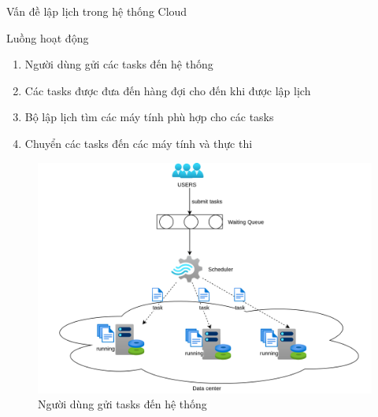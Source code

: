 \documentclass[11pt,xcolor={dvipsnames}, aspectratio=169]{beamer}
\begin{document}
\begin{frame}
{Vấn đề lập lịch trong hệ thống Cloud}
\begin{minipage}[t]{0.48\linewidth}
	\begin{block}
	{Luồng hoạt động}
	\begin{enumerate}
		\item Người dùng gửi các tasks đến hệ thống
		\item Các tasks được đưa đến hàng đợi cho đến khi được lập lịch
		\item Bộ lập lịch tìm các máy tính phù hợp cho các tasks
		\item Chuyển các tasks đến các máy tính và thực thi
	\end{enumerate}
	\end{block}
\end{minipage}
\hfill
\begin{minipage}[t]{0.48\linewidth}
	\begin{figure}
		\centering
		\includegraphics[scale=0.4]{images/basic_flow.png}
		\caption{Người dùng gửi tasks đến hệ thống}
	\end{figure}
\end{minipage}
\end{frame}
\end{document}

